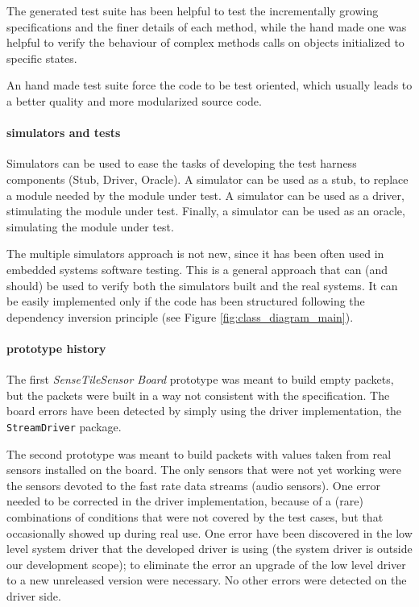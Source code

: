 \documentclass[english]{lni}
\newcommand{\lil}[1]{\texttt{\lstinline|#1|}}
\newcommand{\ST}{\emph{SenseTile}\xspace}
\newcommand{\SB}{\emph{Sensor Board}\xspace}
\newcommand{\STSB}{\ST \SB\xspace}
\begin{document}
The generated test suite has been helpful to test the incrementally growing specifications and the finer details of each method, while the hand made one was helpful to verify the behaviour of complex methods calls on objects initialized to specific states. 

An hand made test suite force the code to be test oriented, which usually leads to a better quality and more modularized source code\cite{Binder1999}.

\paragraph*{simulators and tests}

Simulators can be used to ease the tasks of developing the test harness components (Stub, Driver, Oracle).
A simulator can be used as a stub, to replace a module needed by the module under test.
A simulator can be used as a driver, stimulating the module under test.
Finally, a simulator can be used as an oracle, simulating the module under test.

The multiple simulators approach is not new, since it has been often used in embedded systems software testing\cite{Broekman2002}.  
This is a general approach that can (and should) be used to verify both the simulators built and the real systems.  
It can be easily implemented only if the code has been structured following the dependency inversion principle\cite{Martin1996} (see Figure
\ref{fig:class_diagram_main}).

\paragraph*{prototype history}

The first \STSB prototype was meant to build empty packets, but the packets were built in a way not consistent with the specification.  
The board errors have been detected by simply using the driver implementation, the \lil{StreamDriver} package.

The second prototype was meant to build packets with values taken from real sensors installed on the board.  
The only sensors that were not yet working were the sensors devoted to the fast rate data streams (audio sensors).  
One error needed to be corrected in the driver implementation, because of a (rare) combinations of conditions that were not covered by the test cases, but that occasionally showed up during real use.
One error have been discovered in the low level system driver that the developed driver is using (the system driver is outside our development scope); to eliminate the error an upgrade of the low level driver to a new unreleased version were necessary. 
No other errors were detected on the driver side.
\end{document}
